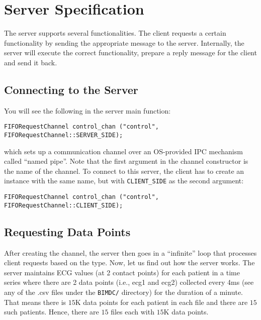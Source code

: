 \documentclass[12pt]{article}
\begin{document}
\section*{Server Specification}
The server supports several functionalities. The client requests a certain functionality by sending the appropriate message to the server. Internally, the server will execute the correct functionality, prepare a reply message for the client and send it back.

\subsection*{Connecting to the Server}
You will see the following in the server main function:
\begin{lstlisting}[style=C++]
FIFORequestChannel control_chan ("control", FIFORequestChannel::SERVER_SIDE);
\end{lstlisting}
which sets up a communication channel over an OS-provided IPC mechanism called ``named pipe''. Note that the first argument in the channel constructor is the name of the channel. To connect to this server, the client has to create an instance with the same name, but with \texttt{CLIENT\_SIDE} as the second argument:

\begin{lstlisting}[style=C++]
FIFORequestChannel control_chan ("control", FIFORequestChannel::CLIENT_SIDE);
\end{lstlisting}


\subsection*{Requesting Data Points}
After creating the channel, the server then goes in a ``infinite'' loop that processes client requests based on the type. Now, let us find out how the server works. The server maintains ECG values (at 2 contact points) for each patient in a time series where there are 2 data points (i.e., ecg1 and ecg2) collected every 4ms (see any of the .csv files under the \texttt{BIMDC/} directory) for the duration of a minute. That means there is $15$K data points for each patient in each file and there are $15$ such patients. Hence, there are $15$ files each with $15$K data points.
\end{document}
